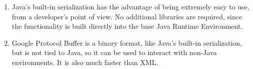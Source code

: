 \documentclass{article}
\begin{document}
\begin{enumerate}
\begin{enumerate}
            \item
                Java's built-in serialization has the advantage of being
                extremely easy to use, from a developer's point of view.
                No additional libraries are required, since the
                functionality is built directly into the base Java Runtime
                Environment.

            \item
                Google Protocol Buffer is a binary format, like Java's
                built-in serialization, but is not tied to Java, so it can
                be used to interact with non-Java environments. It is also
                much faster than XML.
        \end{enumerate}
\end{enumerate}
\end{document}
